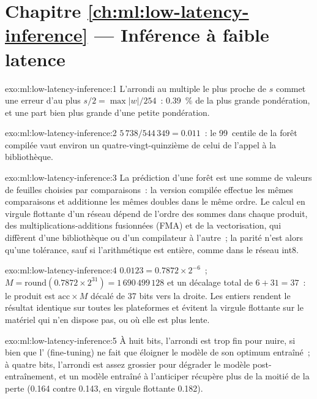 \section*{Chapitre \ref{ch:ml:low-latency-inference} --- Inférence à faible latence}

\begin{solution}{exo:ml:low-latency-inference:1}
L'arrondi au multiple le plus proche de $s$ commet une erreur d'au plus $s/2 = \max|w|/254$~: 0.39~\% de la plus grande
pondération, et une part bien plus grande d'une petite pondération.
\end{solution}

\begin{solution}{exo:ml:low-latency-inference:2}
$5\,738/544\,349 = 0.011$~: le 99~centile de la forêt compilée vaut environ un quatre-vingt-quinzième de celui de l'appel à la bibliothèque.
\end{solution}

\begin{solution}{exo:ml:low-latency-inference:3}
La prédiction d'une forêt est une somme de valeurs de feuilles choisies par comparaisons~: la version compilée effectue les mêmes comparaisons et additionne les mêmes doubles dans le même ordre.
Le calcul en virgule flottante d'un réseau dépend de l'ordre des sommes dans chaque produit, des multiplications-additions fusionnées (FMA) et de la
vectorisation, qui diffèrent d'une bibliothèque ou d'un compilateur à l'autre~; la parité n'est alors qu'une tolérance, sauf si
l'arithmétique est entière, comme dans le réseau int8.
\end{solution}

\begin{solution}{exo:ml:low-latency-inference:4}
$0.0123 = 0.7872\times2^{-6}$~; $M = \mathrm{round}(0.7872\times2^{31}) = 1\,690\,499\,128$ et un décalage total de $6 + 31 = 37$~: le
produit est $\mathrm{acc}\times M$ décalé de 37 bits vers la droite. Les entiers rendent le résultat identique sur toutes les plateformes et évitent
la virgule flottante sur le matériel qui n'en dispose pas, ou où elle est plus lente.
\end{solution}

\begin{solution}{exo:ml:low-latency-inference:5}
À huit bits, l'arrondi est trop fin pour nuire, si bien que l' (fine-tuning) ne fait que éloigner le modèle de son optimum entraîné~; à quatre bits,
l'arrondi est assez grossier pour dégrader le modèle post-entraînement, et un modèle entraîné à l'anticiper récupère plus de la moitié de la
perte (0.164 contre 0.143, en virgule flottante 0.182).
\end{solution}

